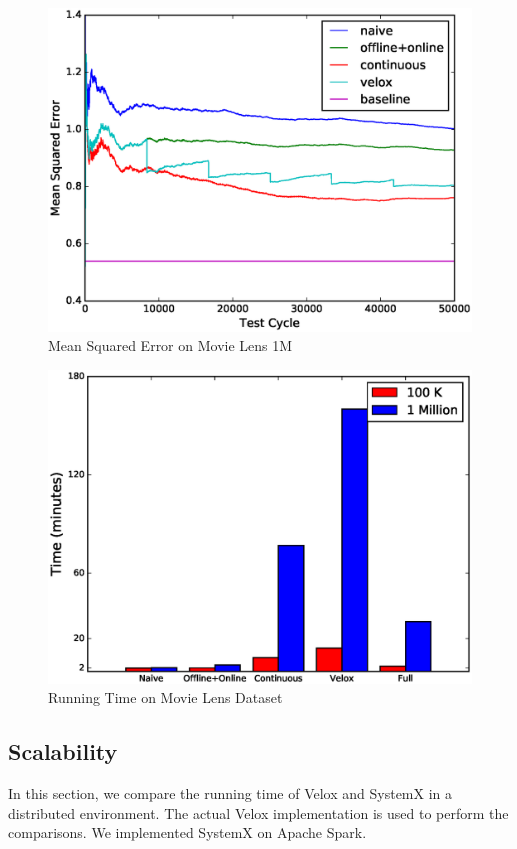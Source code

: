 \documentclass{sig-alternate-05-2015}
\begin{document}
\begin{figure}[!ht]
\centering
\includegraphics[width=\columnwidth]{../images/experiment-results/movie-lens-1m-quality.eps}
\caption{Mean Squared Error on Movie Lens 1M}
\label{fig:movie-lens-1M-score}
\end{figure}


\begin{figure}[!ht]
\centering
\includegraphics[width=\columnwidth]{../images/experiment-results/movie-lens-time.eps}
\caption{Running Time on Movie Lens Dataset}
\label{fig:movie-lens-running-time}
\end{figure}

\subsection{Scalability}
In this section, we compare the running time of Velox and SystemX in a distributed environment.
The actual Velox implementation is used to perform the comparisons.
We implemented SystemX on Apache Spark.
\end{document}
